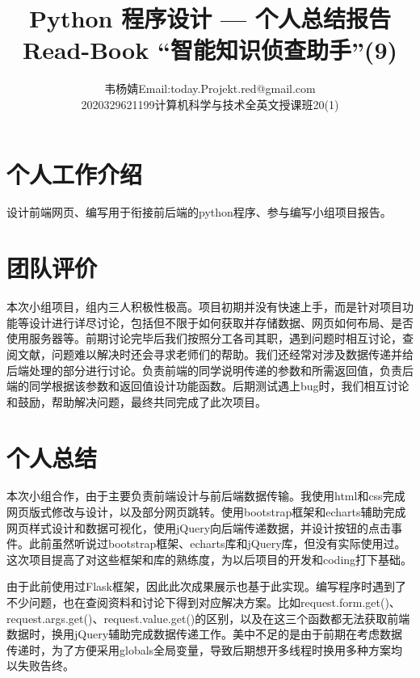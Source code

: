 \documentclass[twoside,11pt]{article}
\makeatletter
\newcommand\studentName{韦杨婧}
\newcommand\studentEmail{Email:today.Projekt.red@gmail.com}
\newcommand\studentNumber{2020329621199}
\newcommand\studentClass{计算机科学与技术全英文授课班20(1)}
\makeatother
\begin{document}
\title{\Huge Python 程序设计 --- 个人总结报告 \\ \huge Read-Book ``智能知识侦查助手''(9) }

\author{\name \studentName \email \studentEmail \\
    \studentNumber \class  \studentClass
}

\maketitle

\section{个人工作介绍}
设计前端网页、编写用于衔接前后端的python程序、参与编写小组项目报告。

\section{团队评价}
本次小组项目，组内三人积极性极高。项目初期并没有快速上手，而是针对项目功能等设计进行详尽讨论，包括但不限于如何获取并存储数据、网页如何布局、是否使用服务器等。前期讨论完毕后我们按照分工各司其职，遇到问题时相互讨论，查阅文献，问题难以解决时还会寻求老师们的帮助。我们还经常对涉及数据传递并给后端处理的部分进行讨论。负责前端的同学说明传递的参数和所需返回值，负责后端的同学根据该参数和返回值设计功能函数。后期测试遇上bug时，我们相互讨论和鼓励，帮助解决问题，最终共同完成了此次项目。

\section{个人总结}
本次小组合作，由于主要负责前端设计与前后端数据传输。我使用html和css完成网页版式修改与设计，以及部分网页跳转。使用bootstrap框架和echarts辅助完成网页样式设计和数据可视化，使用jQuery向后端传递数据，并设计按钮的点击事件。此前虽然听说过bootstrap框架、echarts库和jQuery库，但没有实际使用过。这次项目提高了对这些框架和库的熟练度，为以后项目的开发和coding打下基础。

由于此前使用过Flask框架，因此此次成果展示也基于此实现。编写程序时遇到了不少问题，也在查阅资料和讨论下得到对应解决方案。比如request.form.get()、request.args.get()、request.value.get()的区别，以及在这三个函数都无法获取前端数据时，换用jQuery辅助完成数据传递工作。美中不足的是由于前期在考虑数据传递时，为了方便采用globals全局变量，导致后期想开多线程时换用多种方案均以失败告终。


\thispagestyle{empty}
\end{document}
